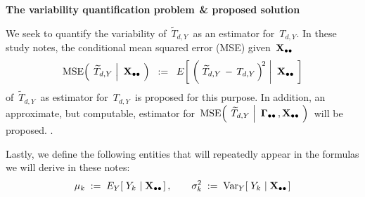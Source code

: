 \begin{center}
\begin{minipage}{5.5in}
\begin{tcolorbox}[arc=8px, colback=white, colframe=black]
\begin{center}
\textbf{The variability quantification problem$\overset{{\color{white}1}}{\textnormal{\color{white}.}}$\& proposed solution}
\end{center}
We seek to quantify the variability of
\,$\widetilde{T}_{d,Y}$\,
as an estimator for
\,$T_{d,Y}$.
\vskip 0.1cm
In these study notes,
the conditional mean squared error (MSE) given \,$\mathbf{X}_{\bullet\bullet}$\,
\begin{equation*}
\textnormal{MSE}\!\left(\;
    \left.
    \widetilde{T}_{d,Y}
    \;\right\vert\!
    \begin{array}{c} \mathbf{X}_{\bullet\bullet} \end{array}
    \!\right)
\;\; := \;\;
    E\!\left[\;\left(\,
        \left.
        \widetilde{T}_{d,Y}
        \, - \,
        T_{d,Y}
        \,\right)^{\!2}
        \;\right\vert\!
        \begin{array}{c} \mathbf{X}_{\bullet\bullet} \end{array}
        \!\right]
\end{equation*}
of
\,$\widetilde{T}_{d,Y}$\,
as estimator for
\,$T_{d,Y}$\,
is proposed for this purpose.
\vskip 0.3cm
\noindent
In addition, an approximate, but computable, estimator for
\,$
\textnormal{MSE}\!\left(\;
    \left.
    \widetilde{T}_{d,Y}
    \;\right\vert\!
    \begin{array}{c} \mathbf{\Gamma}_{\bullet\bullet}\,,\mathbf{X}_{\bullet\bullet} \end{array}
    \!\right)
$\,
will be proposed.
\vskip -0.25cm
{\color{white}.}
\end{tcolorbox}
\end{minipage}
\end{center}
\vskip 0.3cm
\noindent
Lastly, we define the following entities that will repeatedly appear
in the formulas we will derive in these notes:
\begin{equation*}
\mu_{k}
\; := \;
    E_{Y}\!\left[\;Y_{k}\,\left\vert\;\mathbf{X}_{\bullet\bullet}\right.\right],
\quad\quad
\sigma_{k}^{2}
\; := \;
    \textnormal{Var}_{Y}\!\left[\;
        Y_{k}
        \,\left\vert\;
        \mathbf{X}_{\bullet\bullet}
        \right.
        \right]
\end{equation*}
